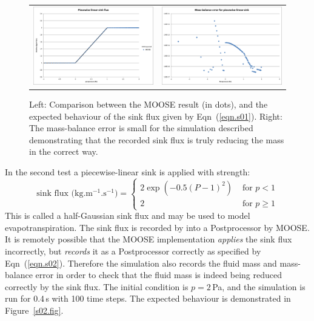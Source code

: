 \documentclass[]{scrreprt}
\begin{document}
\begin{figure}[htb]
\centering
\begin{tabular}{cc}
\includegraphics[width=7cm]{s01.eps} &
\includegraphics[width=7cm]{s01_mass_bal.eps}
\end{tabular}
\caption{Left: Comparison between the MOOSE result (in dots), and the
  expected behaviour of the sink flux given by Eqn~(\ref{eqn.s01}).
  Right: The mass-balance error is small for the simulation described
  demonstrating that the recorded sink flux is truly reducing the mass
  in the correct way.}
\label{s01.fig}
\end{figure}


\noindent In the second test a piecewise-linear sink is applied with strength:
\begin{equation}
\mbox{sink flux (kg.m$^{-1}$.s$^{-1}$)} = \left\{
\begin{array}{ll}
2\exp(-0.5(P-1)^{2}) & \mbox{ for } p < 1 \\
2 & \mbox{ for } p\geq 1 
\end{array}
\right.
\label{eqn.s02}
\end{equation}
This is called a half-Gaussian sink flux and may be used to model
evapotranspiration.  The sink flux is recorded by into a Postprocessor by MOOSE.  It is
remotely possible that the MOOSE implementation {\em applies} the sink
flux incorrectly, but {\em records} it as a Postprocessor correctly as
specified by Eqn~(\ref{eqn.s02}).  Therefore the simulation also
records the fluid mass and mass-balance error in order to check that
the fluid mass is indeed being reduced correctly by the sink flux.
The initial condition is $p=2$\,Pa, and the simulation is run for
0.4\,s with 100 time steps.  The expected behaviour is demonstrated in
Figure~\ref{s02.fig}.
\end{document}
